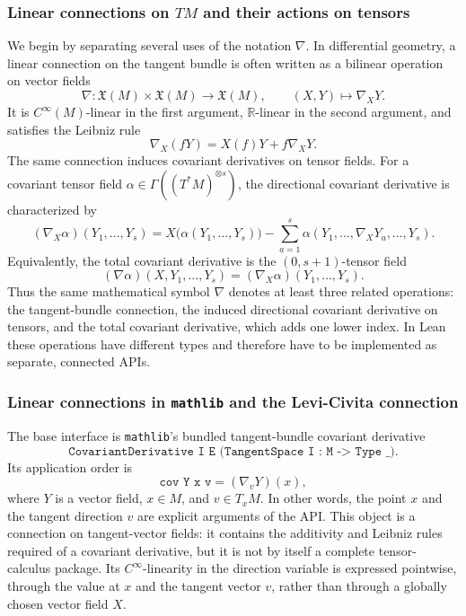 \documentclass[11pt]{article}
\theoremstyle{plain}
\theoremstyle{definition}
\theoremstyle{remark}
\begin{document}
\subsubsection{Linear connections on \texorpdfstring{$TM$}{TM} and their actions on tensors}

We begin by separating several uses of the notation $\nabla$.  In differential
geometry, a linear connection on the tangent bundle is often written as a
bilinear operation on vector fields
\[
  \nabla : \mathfrak X(M) \times \mathfrak X(M) \to \mathfrak X(M),
  \qquad
  (X,Y) \mapsto \nabla_XY .
\]
It is $C^\infty(M)$-linear in the first argument, $\mathbb R$-linear in the
second argument, and satisfies the Leibniz rule
\[
  \nabla_X(fY) = X(f)Y + f\nabla_XY .
\]
The same connection induces covariant derivatives on tensor fields.  For a
covariant tensor field $\alpha \in \Gamma((T^*M)^{\otimes s})$, the directional
covariant derivative is characterized by
\[
  (\nabla_X\alpha)(Y_1,\ldots,Y_s)
  =
  X\bigl(\alpha(Y_1,\ldots,Y_s)\bigr)
  -
  \sum_{a=1}^s
  \alpha(Y_1,\ldots,\nabla_XY_a,\ldots,Y_s).
\]
Equivalently, the total covariant derivative is the $(0,s+1)$-tensor field
\[
  (\nabla\alpha)(X,Y_1,\ldots,Y_s)
  =
  (\nabla_X\alpha)(Y_1,\ldots,Y_s).
\]
Thus the same mathematical symbol $\nabla$ denotes at least three related
operations: the tangent-bundle connection, the induced directional covariant
derivative on tensors, and the total covariant derivative, which adds one lower
index.  In Lean these operations have different types and therefore have to be
implemented as separate, connected APIs.

\subsubsection{Linear connections in \texttt{mathlib} and the Levi-Civita connection}

The base interface is \texttt{mathlib}'s bundled tangent-bundle covariant
derivative
\[
  \texttt{CovariantDerivative I E (TangentSpace I : M -> Type \_)} .
\]
Its application order is
\[
  \texttt{cov Y x v} = (\nabla_vY)(x),
\]
where $Y$ is a vector field, $x\in M$, and $v\in T_xM$.  In other words, the
point $x$ and the tangent direction $v$ are explicit arguments of the API.  This
object is a connection on tangent-vector fields: it contains the additivity and
Leibniz rules required of a covariant derivative, but it is not by itself a
complete tensor-calculus package.  Its $C^\infty$-linearity in the direction
variable is expressed pointwise, through the value at $x$ and the tangent vector
$v$, rather than through a globally chosen vector field $X$.
\end{document}
